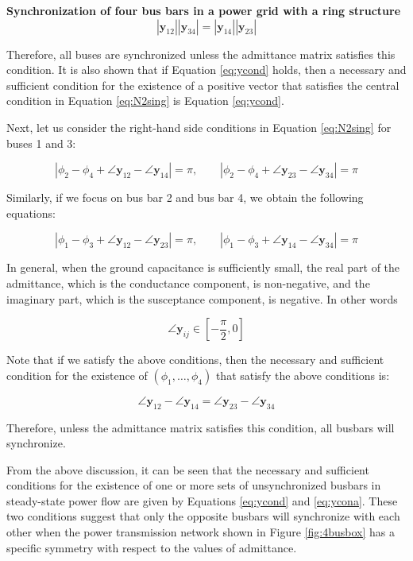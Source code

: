 \documentclass[graybox, envcountchap]{svmult}
\begin{document}
\begin{example}{\textbf{Synchronization of four bus bars in a power grid with a ring
structure}}
\begin{equation}\label{eq:ycond}
  |\bm{y}_{12}||\bm{y}_{34}| = |\bm{y}_{14}||\bm{y}_{23}|
\end{equation}

Therefore, all buses are synchronized unless the admittance matrix satisfies
this condition. It is also shown that if Equation \ref{eq:ycond} holds, then a
necessary and sufficient condition for the existence of a positive vector that
satisfies the central condition in Equation \ref{eq:N2sing}  is Equation
\ref{eq:ycond}.

Next, let us consider the right-hand side conditions in Equation \ref{eq:N2sing}
for buses 1 and 3:

\begin{equation*}
  |\phi_2 - \phi_4 + \angle \bm{y}_{12} - \angle \bm{y}_{14}|=\pi
  ,\qquad
  |\phi_2 - \phi_4 + \angle \bm{y}_{23} - \angle \bm{y}_{34}|=\pi
\end{equation*}

Similarly, if we focus on bus bar 2 and bus bar 4, we obtain the following
equations:

\begin{equation*}
  |\phi_1 - \phi_3 + \angle \bm{y}_{12} - \angle \bm{y}_{23}|=\pi
  ,\qquad
  |\phi_1 - \phi_3 + \angle \bm{y}_{14} - \angle \bm{y}_{34}|=\pi
\end{equation*}

In general, when the ground capacitance is sufficiently small, the real part of
the admittance, which is the conductance component, is non-negative, and the
imaginary part, which is the susceptance component, is negative. In other words

\[
  \angle \bm{y}_{ij} \in \left[-\frac{\pi}{2},0 \right]
\]

Note that if we satisfy the above conditions, then the necessary and sufficient
condition for the existence of $(\phi_1,\ldots,\phi_4)$ that satisfy the above
conditions is:

\begin{equation}\label{eq:ycona}
  \angle \bm{y}_{12} - \angle \bm{y}_{14}=
  \angle \bm{y}_{23} - \angle \bm{y}_{34}
\end{equation}

Therefore, unless the admittance matrix satisfies this condition, all busbars
will synchronize.

From the above discussion, it can be seen that the necessary and sufficient
conditions for the existence of one or more sets of unsynchronized busbars in
steady-state power flow are given by Equations \ref{eq:ycond} and
\ref{eq:ycona}. These two conditions suggest that only the opposite busbars will
synchronize with each other when the power transmission network shown in Figure
\ref{fig:4busbox} has a specific symmetry with respect to the values of
admittance.
\end{example}
\end{document}
